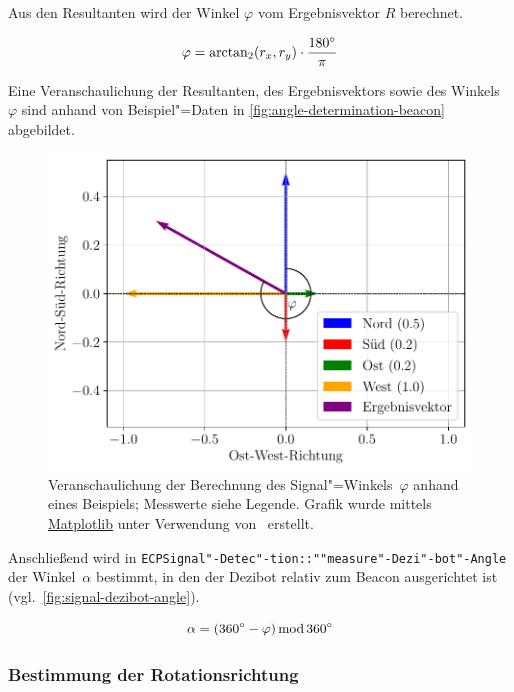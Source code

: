 Aus den Resultanten wird der Winkel $\varphi$ vom Ergebnisvektor $R$ berechnet.

\begin{equation*}
    \varphi = \arctan_2(r_{x}, r_{y}) \cdot \frac{180^\circ}{\pi}
\end{equation*}

Eine Veranschaulichung der Resultanten, des Ergebnisvektors sowie des Winkels~$\varphi$ sind anhand von Beispiel"=Daten in \autoref{fig:angle-determination-beacon} abgebildet.

\begin{figure}[h]
    \includegraphics[width=\textwidth]{../plot/signal_direction.pdf}
    \caption{Veranschaulichung der Berechnung des Signal"=Winkels~$\varphi$ anhand eines Beispiels; Messwerte siehe Legende. Grafik wurde mittels \href{https://matplotlib.org/}{Matplotlib} unter Verwendung von~\cite{matplotlibdevelopmentteamScaleInvariantAngle} erstellt.}
    \label{fig:angle-determination-beacon}
\end{figure}

Anschließend wird in \texttt{ECPSignal"-Detec"-tion::""measure"-Dezi"-bot"-Angle} der Winkel~$\alpha$ bestimmt, in den der Dezibot relativ zum Beacon ausgerichtet ist (vgl.~\autoref{fig:signal-dezibot-angle}).

\vspace{-1em}
\begin{equation*}
    \alpha = (360^\circ - \varphi) \operatorname{mod} 360^\circ
\end{equation*}


\subsubsection{Bestimmung der Rotationsrichtung}
\label{sec:rotation-direction-determination}

